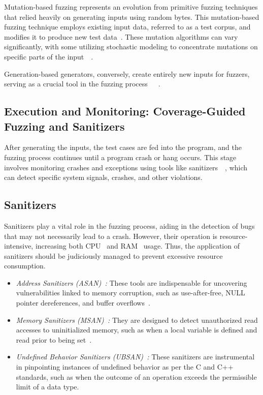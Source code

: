 Mutation-based fuzzing represents an evolution from primitive fuzzing techniques
that relied heavily on generating inputs using random bytes.
This mutation-based fuzzing technique employs existing input data,
referred to as a test \gls{corpus}, and modifies it to produce new test data~\cite{miller2007analysis}.
These mutation algorithms can vary significantly, with some utilizing
stochastic modeling to concentrate mutations on specific parts of the input~\cite{lyu2022ems}~\cite{miller2007analysis}.

Generation-based generators, conversely, create entirely new inputs
for fuzzers, serving as a crucial tool in the
fuzzing process~\cite{li2018fuzzing}~\cite{miller2007analysis}~\cite{wang2017skyfire}.

\subsection{Execution and Monitoring: Coverage-Guided Fuzzing and Sanitizers}
After generating the inputs, the test cases are fed into the program, and the
fuzzing process continues until a program crash or hang occurs. This
stage involves monitoring crashes and exceptions using tools like
sanitizers~\cite{GitHubgo55:online}~\cite{osterlund2020parmesan}, which can detect specific system signals,
crashes, and other violations.

\subsection*{Sanitizers}

Sanitizers play a vital role in the fuzzing process, aiding in the detection of
bugs that may not necessarily lead to a crash. However, their operation is
resource-intensive, increasing both CPU~\cite{WhatisaC78:online} and
RAM~\cite{WhatisRA11:online} usage. Thus, the application of
sanitizers should be judiciously managed to prevent excessive resource consumption.

\begin{itemize}

\item \textit{Address Sanitizers (ASAN)~\cite{AddressS43:online}:} These tools
are indispensable for uncovering vulnerabilities linked to memory corruption,
such as use-after-free, NULL pointer dereferences, and buffer overflows~\cite{haller2013dowsing}.

\item \textit{Memory Sanitizers (MSAN)~\cite{MemorySa64:online}:} They are designed
to detect unauthorized read accesses to uninitialized memory, such as when a local
variable is defined and read prior to being set~\cite{stepanov2015memorysanitizer}.

\item \textit{Undefined Behavior Sanitizers (UBSAN)~\cite{Undefine50:online}:} These sanitizers are instrumental
in pinpointing instances of undefined behavior as per the C and C++ standards,
such as when the outcome of an operation exceeds the permissible limit of a data type.
\end{itemize}

